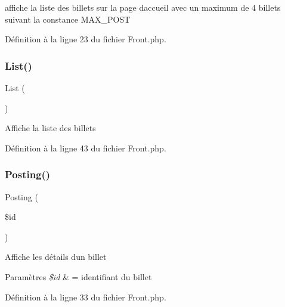affiche la liste des billets sur la page d\textquotesingle{}accueil avec un maximum de 4 billets suivant la constance M\+A\+X\+\_\+\+P\+O\+ST 

Définition à la ligne 23 du fichier Front.\+php.

\mbox{\label{class_src_1_1_controllers_1_1_front_a17e6c90f14225bdac5c65ed915b0a2f6}} 
\subsubsection{\texorpdfstring{List()}{List()}}
{\footnotesize\ttfamily List (\begin{DoxyParamCaption}{ }\end{DoxyParamCaption})}

Affiche la liste des billets 

Définition à la ligne 43 du fichier Front.\+php.

\mbox{\label{class_src_1_1_controllers_1_1_front_a5fcbe325afb03acc6e4eaec38a7bb1ae}} 
\subsubsection{\texorpdfstring{Posting()}{Posting()}}
{\footnotesize\ttfamily Posting (\begin{DoxyParamCaption}\item[{}]{\$id }\end{DoxyParamCaption})}

Affiche les détails d\textquotesingle{}un billet 
\begin{DoxyParams}{Paramètres}
{\em \$id} & = identifiant du billet \\
\hline
\end{DoxyParams}


Définition à la ligne 33 du fichier Front.\+php.

\mbox{\label{class_src_1_1_controllers_1_1_front_a8b22c40bd1737bbb7db0816b7e9763b3}} 
